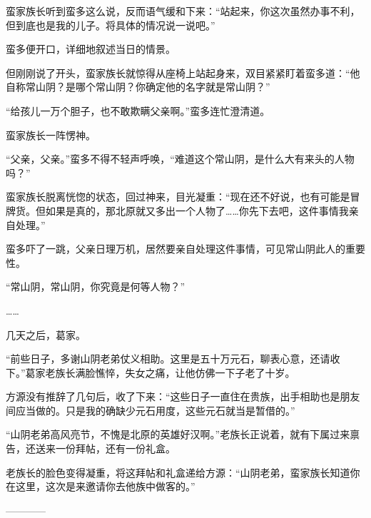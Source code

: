 \begin{this_body}
蛮家族长听到蛮多这么说，反而语气缓和下来：“站起来，你这次虽然办事不利，但到底也是我的儿子。将具体的情况说一说吧。”

蛮多便开口，详细地叙述当日的情景。

但刚刚说了开头，蛮家族长就惊得从座椅上站起身来，双目紧紧盯着蛮多道：“他自称常山阴？是哪个常山阴？你确定他的名字就是常山阴？”

“给孩儿一万个胆子，也不敢欺瞒父亲啊。”蛮多连忙澄清道。

蛮家族长一阵愣神。

“父亲，父亲。”蛮多不得不轻声呼唤，“难道这个常山阴，是什么大有来头的人物吗？”

蛮家族长脱离恍惚的状态，回过神来，目光凝重：“现在还不好说，也有可能是冒牌货。但如果是真的，那北原就又多出一个人物了……你先下去吧，这件事情我亲自处理。”

蛮多吓了一跳，父亲日理万机，居然要亲自处理这件事情，可见常山阴此人的重要性。

“常山阴，常山阴，你究竟是何等人物？”

……

几天之后，葛家。

“前些日子，多谢山阴老弟仗义相助。这里是五十万元石，聊表心意，还请收下。”葛家老族长满脸憔悴，失女之痛，让他仿佛一下子老了十岁。

方源没有推辞了几句后，收了下来：“这些日子一直住在贵族，出手相助也是朋友间应当做的。只是我的确缺少元石用度，这些元石就当是暂借的。”

“山阴老弟高风亮节，不愧是北原的英雄好汉啊。”老族长正说着，就有下属过来禀告，还送来一份拜帖，还有一份礼盒。

老族长的脸色变得凝重，将这拜帖和礼盒递给方源：“山阴老弟，蛮家族长知道你在这里，这次是来邀请你去他族中做客的。”

------------

\end{this_body}

